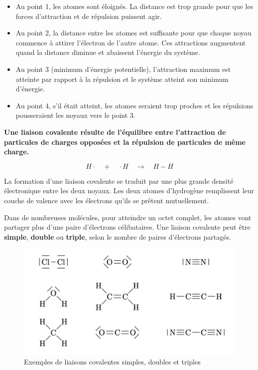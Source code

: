 \documentclass[
  11pt,
  a4paper,
  openany]{book}
\providecommand{\tightlist}{%
  \setlength{\itemsep}{0pt}\setlength{\parskip}{0pt}}
\begin{document}
\begin{itemize}
\tightlist
\item
  Au point 1, les atomes sont éloignés. La distance est trop grande pour que les forces d'attraction et de répulsion puissent agir.
\item
  Au point 2, la distance entre les atomes est suffisante pour que chaque noyau commence à attirer l'électron de l'autre atome. Ces attractions augmentent quand la distance diminue et abaissent l'énergie du système.
\item
  Au point 3 (minimum d'énergie potentielle), l'attraction maximum est atteinte par rapport à la répulsion et le système atteint son minimum d'énergie.
\item
  Au point 4, s'il était atteint, les atomes seraient trop proches et les répulsions pousseraient les noyaux vers le point 3.
\end{itemize}

\textbf{Une liaison covalente résulte de l'équilibre entre l'attraction de particules de charges opposées et la répulsion de particules de même charge.}

\[ H \cdot \quad + \quad \cdot H \quad \longrightarrow \quad H-H \]

La formation d'une liaison covalente se traduit par une plus grande densité électronique entre les deux noyaux. Les deux atomes d'hydrogène remplissent leur couche de valence avec les électrons qu'ils se prêtent mutuellement.

Dans de nombreuses molécules, pour atteindre un octet complet, les atomes vont partager plus d'une paire d'électrons célibataires. Une liaison covalente peut être \textbf{simple}, \textbf{double} ou \textbf{triple}, selon le nombre de paires d'électrons partagés.

\begin{figure}

{\centering \includegraphics[width=0.67\linewidth]{images/liaisons-multiples} 

}

\caption{Exemples de liaisons covalentes simples, doubles et triples}\label{fig:liaisons-multiples}
\end{figure}
\end{document}
